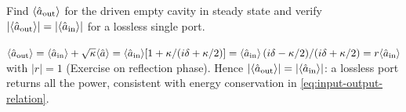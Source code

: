 \begin{exercise}
Find $\langle\hat a_{\rm out}\rangle$ for the driven empty cavity in
steady state and verify $|\langle\hat a_{\rm out}\rangle|=|\langle\hat a_{\rm in}\rangle|$
for a lossless single port.
\begin{solution}
$\langle\hat a_{\rm out}\rangle=\langle\hat a_{\rm in}\rangle+\sqrt\kappa\langle\hat a\rangle
=\langle\hat a_{\rm in}\rangle[1+\kappa/(i\delta+\kappa/2)]
=\langle\hat a_{\rm in}\rangle\,(i\delta-\kappa/2)/(i\delta+\kappa/2)=r\langle\hat a_{\rm in}\rangle$
with $|r|=1$ (Exercise on reflection phase). Hence
$|\langle\hat a_{\rm out}\rangle|=|\langle\hat a_{\rm in}\rangle|$:
a lossless port returns all the power, consistent with energy
conservation in \cref{eq:input-output-relation}.
\end{solution}
\end{exercise}
